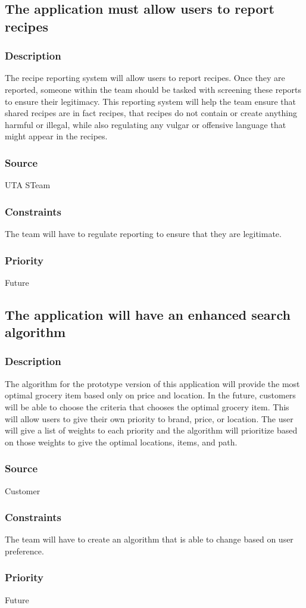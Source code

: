 \subsection{The application must allow users to report recipes}
\subsubsection{Description}
The recipe reporting system will allow users to report recipes. Once they are reported, someone within the team should be tasked with screening these reports to ensure their legitimacy. This reporting system will help the team ensure that shared recipes are in fact recipes, that recipes do not contain or create anything harmful or illegal, while also regulating any vulgar or offensive language that might appear in the recipes.
\subsubsection{Source}
UTA STeam
\subsubsection{Constraints}
The team will have to regulate reporting to ensure that they are legitimate.
\subsubsection{Priority}
Future

\subsection{The application will have an enhanced search algorithm}
\subsubsection{Description}
The algorithm for the prototype version of this application  will provide the most optimal grocery item based only on price and location. In the future, customers will be able to choose the criteria that chooses the optimal grocery item. This will allow users to give their own priority to brand, price, or location. The user will give a list of weights to each priority and the algorithm will prioritize based on those weights to give the optimal locations, items, and path.
\subsubsection{Source}
Customer
\subsubsection{Constraints}
The team will have to create an algorithm that is able to change based on user preference.
\subsubsection{Priority}
Future